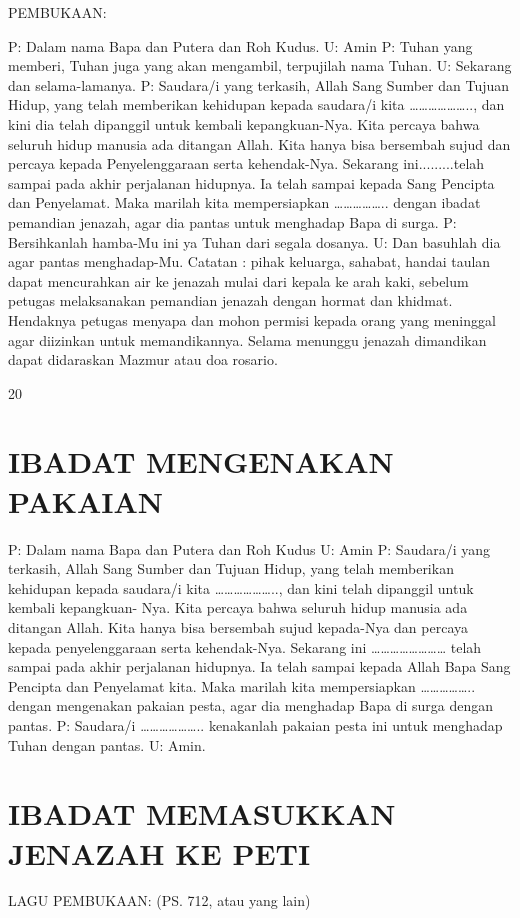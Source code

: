 \documentclass[10pt,a5paper,fancyhdr]{memoir}
\begin{document}
PEMBUKAAN: 

P: Dalam nama Bapa dan Putera dan Roh Kudus. 
U: Amin 
P: Tuhan yang memberi, Tuhan juga yang akan mengambil, 
terpujilah nama Tuhan. 
U: Sekarang dan selama-lamanya. 
P: Saudara/i yang terkasih, Allah Sang Sumber dan Tujuan Hidup, 
yang telah memberikan kehidupan kepada saudara/i kita 
……………….., dan kini dia telah dipanggil untuk kembali 
kepangkuan-Nya. Kita percaya bahwa seluruh hidup manusia ada 
ditangan Allah. Kita hanya bisa bersembah sujud dan percaya kepada 
Penyelenggaraan serta kehendak-Nya. Sekarang ini.........telah sampai 
pada akhir perjalanan hidupnya. Ia telah sampai kepada Sang 
Pencipta dan Penyelamat. Maka marilah kita mempersiapkan 
…………….. dengan ibadat pemandian jenazah, agar dia pantas 
untuk menghadap Bapa di surga. 
P: Bersihkanlah hamba-Mu ini ya Tuhan dari segala dosanya. 
U: Dan basuhlah dia agar pantas menghadap-Mu. 
Catatan : pihak keluarga, sahabat, handai taulan dapat mencurahkan 
air ke jenazah mulai dari kepala ke arah kaki, sebelum petugas 
melaksanakan pemandian jenazah dengan hormat dan khidmat. 
Hendaknya petugas menyapa dan mohon permisi kepada orang yang 
meninggal agar diizinkan untuk memandikannya. 
Selama menunggu jenazah dimandikan dapat didaraskan Mazmur 
atau doa rosario. 

20 



\chapter{IBADAT MENGENAKAN PAKAIAN} 
P: Dalam nama Bapa dan Putera dan Roh Kudus 
U: Amin 
P: Saudara/i yang terkasih, Allah Sang Sumber dan Tujuan Hidup, 
yang telah memberikan kehidupan kepada saudara/i kita 
……………….., dan kini telah dipanggil untuk kembali kepangkuan-
Nya. Kita percaya bahwa seluruh hidup manusia ada ditangan Allah. 
Kita hanya bisa bersembah sujud kepada-Nya dan percaya kepada 
penyelenggaraan serta kehendak-Nya. Sekarang ini 
…………………… telah sampai pada akhir perjalanan hidupnya. Ia 
telah sampai kepada Allah Bapa Sang Pencipta dan Penyelamat kita. 
Maka marilah kita mempersiapkan …………….. dengan 
mengenakan pakaian pesta, agar dia menghadap Bapa di surga 
dengan pantas. 
P: Saudara/i ……………….. kenakanlah pakaian pesta ini untuk 
menghadap Tuhan dengan pantas. 
U: Amin. 

\chapter{IBADAT MEMASUKKAN JENAZAH KE PETI} 
LAGU PEMBUKAAN: (PS. 712, atau yang lain) 
\end{document}

